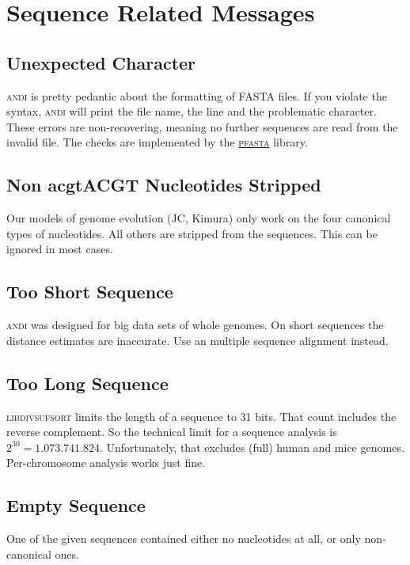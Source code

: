 \documentclass[a4paper,
  10pt,
  english,
  DIV=12,
  BCOR=8mm]{scrbook}
\newcommand{\algo}[1]{\textsc{{#1}}}
\newcommand{\andi}{\algo{andi}\xspace}
\begin{document}
\section{Sequence Related Messages}

\subsection*{Unexpected Character}

\andi is pretty pedantic about the formatting of \algo{FASTA} files. If you violate the syntax, \andi will print the file name, the line and the problematic character. These errors are non-recovering, meaning no further sequences are read from the invalid file. The checks are implemented by the \href{https://github.com/kloetzl/pfasta}{\algo{pfasta}} library.


\subsection*{Non acgtACGT Nucleotides Stripped}

Our models of genome evolution (JC, Kimura) only work on the four canonical types of nucleotides. All others are stripped from the sequences. This can be ignored in most cases.

\subsection*{Too Short Sequence}

\andi was designed for big data sets of whole genomes. On short sequences the distance estimates are inaccurate. Use an multiple sequence alignment instead.

\subsection*{Too Long Sequence}

\algo{libdivsufsort} limits the length of a sequence to 31 bits. That count includes the reverse complement. So the technical limit for a sequence analysis is $2^{30} = 1.073.741.824$. Unfortunately, that excludes (full) human and mice genomes. Per-chromosome analysis works just fine.

\subsection*{Empty Sequence}

One of the given sequences contained either no nucleotides at all, or only non-canonical ones.
\end{document}
